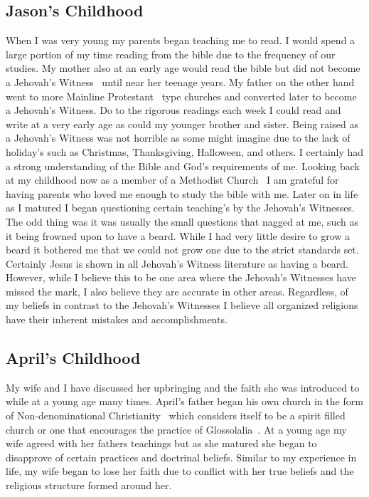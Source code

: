 \documentclass[11pt,a4paper]{scrartcl} %
\begin{document}
\begin{doublespace}
\subsection{Jason's Childhood}
When I was very young my parents began teaching me to read. I would spend a large portion of my time reading from the bible due to the frequency of our studies. My mother also at an early age would read the bible but did not become a Jehovah's Witness~\cite{wiki:001} until near her teenage years. My father on the other hand went to more Mainline Protestant~\cite{wiki:003} type churches and converted later to become a Jehovah's Witness. Do to the rigorous readings each week I could read and write at a very early age as could my younger brother and sister. Being raised as a Jehovah's Witness was not horrible as some might imagine due to the lack of holiday's such as Christmas, Thanksgiving, Halloween, and others. I certainly had a strong understanding of the Bible and God's requirements of me. Looking back at my childhood now as a member of a Methodist Church~\cite{wiki:002} I am grateful for having parents who loved me enough to study the bible with me. Later on in life as I matured I began questioning certain teaching's by the Jehovah's Witnesses. The odd thing was it was usually the small questions that nagged at me, such as it being frowned upon to have a beard. While I had very little desire to grow a beard it bothered me that we could not grow one due to the strict standards set. Certainly Jesus is shown in all Jehovah's Witness literature as having a beard. However, while I believe this to be one area where the Jehovah's Witnesses have missed the mark, I also believe they are accurate in other areas. Regardless, of my beliefs in contrast to the Jehovah's Witnesses I believe all organized religions have their inherent mistakes and accomplishments. 
\subsection{April's Childhood}
My wife and I have discussed her upbringing and the faith she was introduced to while at a young age many times. April's father began his own church in the form of Non-denominational Christianity~\cite{wiki:004} which considers itself to be a spirit filled church or one that encourages the practice of Glossolalia~\cite{wiki:005}. At a young age my wife agreed with her fathers teachings but as she matured she began to disapprove of certain practices and doctrinal beliefs. Similar to my experience in life, my wife began to lose her faith due to conflict with her true beliefs and the religious structure formed around her. 
\end{doublespace}
\end{document}
